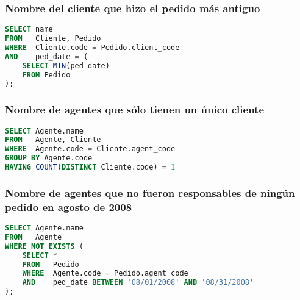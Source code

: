 \subsubsection{Nombre del cliente que hizo el pedido más antiguo}

\begin{lstlisting}[language=SQL]
SELECT name
FROM   Cliente, Pedido
WHERE  Cliente.code = Pedido.client_code
AND    ped_date = (
	SELECT MIN(ped_date)
	FROM Pedido
);
\end{lstlisting}

\subsubsection{Nombre de agentes que sólo tienen un único cliente}

\begin{lstlisting}[language=SQL]
SELECT Agente.name
FROM   Agente, Cliente
WHERE  Agente.code = Cliente.agent_code
GROUP BY Agente.code
HAVING COUNT(DISTINCT Cliente.code) = 1
\end{lstlisting}

\subsubsection{Nombre de agentes que no fueron responsables de ningún pedido en agosto de 2008}

\begin{lstlisting}[language=SQL]
SELECT Agente.name
FROM   Agente
WHERE NOT EXISTS (
	SELECT *
	FROM   Pedido
	WHERE  Agente.code = Pedido.agent_code
	AND    ped_date BETWEEN '08/01/2008' AND '08/31/2008'
);
\end{lstlisting}
